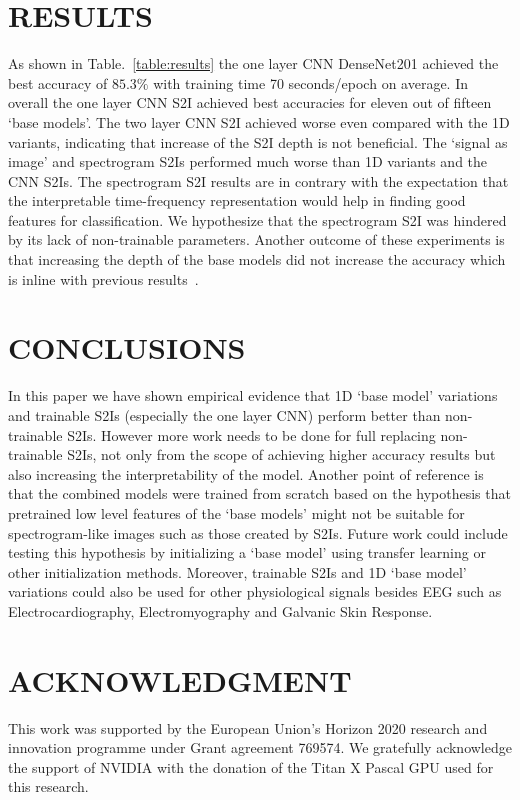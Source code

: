 \documentclass[conference]{IEEEtran}
\begin{document}
\section{RESULTS}
As shown in Table.~\ref{table:results} the one layer CNN DenseNet201
achieved the best accuracy of $85.3\%$ with training time 70
seconds/epoch on average.
In overall the one layer CNN S2I achieved best accuracies for eleven
out of fifteen `base models'.
The two layer CNN S2I achieved worse even compared with the 1D
variants, indicating that increase of the S2I depth is not beneficial.
The `signal as image' and spectrogram S2Is performed much worse than
1D variants and the CNN S2Is.
The spectrogram S2I results are in contrary with the expectation that
the interpretable time-frequency representation would help in finding
good features for classification.
We hypothesize that the spectrogram S2I was hindered by its lack of
non-trainable parameters.
Another outcome of these experiments is that increasing the depth of
the base models did not increase the accuracy which is inline with
previous results~\cite{schirrmeister2017deep}.

\section{CONCLUSIONS}
In this paper we have shown empirical evidence that 1D `base model'
variations and trainable S2Is (especially the one layer CNN) perform
better than non-trainable S2Is.
However more work needs to be done for full replacing non-trainable
S2Is, not only from the scope of achieving higher accuracy results
but also increasing the interpretability of the model.
Another point of reference is that the combined models were trained
from scratch based on the hypothesis that pretrained low level
features of the `base models' might not be suitable for
spectrogram-like images such as those created by S2Is.
Future work could include testing this hypothesis by initializing a
`base model' using transfer learning or other initialization methods.
Moreover, trainable S2Is and 1D `base model' variations could also be
used for other physiological signals besides EEG such as
Electrocardiography, Electromyography and Galvanic Skin Response.

\section*{ACKNOWLEDGMENT}
This work was supported by the European Union's Horizon 2020 research
and innovation programme under Grant agreement 769574.
We gratefully acknowledge the support of NVIDIA with the donation of
the Titan X Pascal GPU used for this research.



\end{document}
